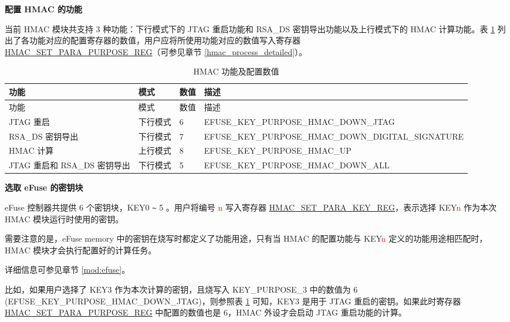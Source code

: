 \documentclass[main\_\_CN.tex]{subfiles}
\begin{document}
\textbf{配置 HMAC 的功能}

当前 HMAC 模块共支持 3 种功能：下行模式下的 JTAG 重启功能和 RSA\_DS 密钥导出功能以及上行模式下的 HMAC 计算功能。表 \ref{table: HMAC_key_purpose} 列出了各功能对应的配置寄存器的数值，用户应将所使用功能对应的数值写入寄存器\\ \hyperref[regdesc:HMACSETPARAPURPOSEREG]{HMAC\_SET\_PARA\_PURPOSE\_REG}（可参见章节 \ref{hmac_process_detailed}）。

\begin{longtable}[c]{|p{2cm}|p{2cm}|p{2cm}|p{9.5cm}|}
\caption{HMAC 功能及配置数值}
\label{table: HMAC_key_purpose}
\\    \hline
    \rowcolor{lightgray}
    功能 & 模式 & 数值 & 描述 \\
    \hline
    \endfirsthead

    \hline
    \rowcolor{lightgray}
    功能 & 模式 & 数值 & 描述 \\
    \hline
    \endhead

    \endfoot

    \hline
    \endlastfoot

    \hline
    JTAG 重启 & 下行模式 & 6 & EFUSE\_KEY\_PURPOSE\_HMAC\_DOWN\_JTAG \\
    \hline
    RSA\_DS 密钥导出 & 下行模式 & 7 & EFUSE\_KEY\_PURPOSE\_HMAC\_DOWN\_DIGITAL\_SIGNATURE \\
    \hline
    HMAC 计算 & 上行模式 & 8 & EFUSE\_KEY\_PURPOSE\_HMAC\_UP \\
    \hline
    JTAG 重启和 RSA\_DS 密钥导出 & 下行模式 & 5 & EFUSE\_KEY\_PURPOSE\_HMAC\_DOWN\_ALL \\
    \hline
\end{longtable}

\textbf{选取 eFuse 的密钥块}
\label{hmac_config_efuse_key}

eFuse 控制器共提供 6 个密钥块，KEY0 \verb+~+ 5 。用户将编号 \textcolor{red}{n} 写入寄存器 \hyperref[regdesc:HMACSETPARAKEYREG]{HMAC\_SET\_PARA\_KEY\_REG}，表示选择 KEY\textcolor{red}{n} 作为本次 HMAC 模块运行时使用的密钥。

需要注意的是，eFuse memory 中的密钥在烧写时都定义了功能用途，只有当 HMAC 的配置功能与 KEY\textcolor{red}{n} 定义的功能用途相匹配时，HMAC 模块才会执行配置好的计算任务。

详细信息可参见章节 \ref{mod:efuse}。

比如，如果用户选择了 KEY3 作为本次计算的密钥，且烧写入 KEY\_PURPOSE\_3 中的数值为 6\\ (EFUSE\_KEY\_PURPOSE\_HMAC\_DOWN\_JTAG)，则参照表 \ref{table: HMAC_key_purpose} 可知，KEY3 是用于 JTAG 重启的密钥。如果此时寄存器 \hyperref[regdesc:HMACSETPARAPURPOSEREG]{HMAC\_SET\_PARA\_PURPOSE\_REG} 中配置的数值也是 6，HMAC 外设才会启动 JTAG 重启功能的计算。
\end{document}
